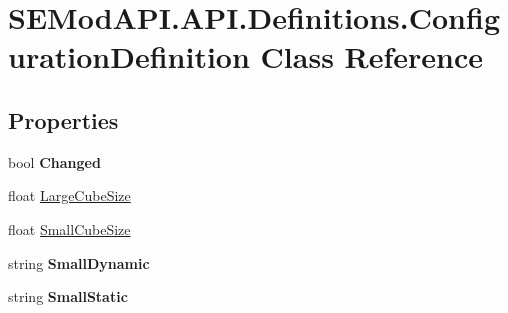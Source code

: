 \hypertarget{class_s_e_mod_a_p_i_1_1_a_p_i_1_1_definitions_1_1_configuration_definition}{}\section{S\+E\+Mod\+A\+P\+I.\+A\+P\+I.\+Definitions.\+Configuration\+Definition Class Reference}
\label{class_s_e_mod_a_p_i_1_1_a_p_i_1_1_definitions_1_1_configuration_definition}
\subsection*{Properties}
\begin{DoxyCompactItemize}
\item 
\hypertarget{class_s_e_mod_a_p_i_1_1_a_p_i_1_1_definitions_1_1_configuration_definition_a7245cb4a0904817e056743035be7d2b4}{}bool {\bfseries Changed}\label{class_s_e_mod_a_p_i_1_1_a_p_i_1_1_definitions_1_1_configuration_definition_a7245cb4a0904817e056743035be7d2b4}

\item 
float \hyperlink{class_s_e_mod_a_p_i_1_1_a_p_i_1_1_definitions_1_1_configuration_definition_ab9cdee5652ef56b1ce4592ad8c447992}{Large\+Cube\+Size}
\item 
float \hyperlink{class_s_e_mod_a_p_i_1_1_a_p_i_1_1_definitions_1_1_configuration_definition_aceadd5f38a6297da375f29a3b35865e6}{Small\+Cube\+Size}
\item 
\hypertarget{class_s_e_mod_a_p_i_1_1_a_p_i_1_1_definitions_1_1_configuration_definition_a1b3ec4d0b6eabd060cde540d10ef3a80}{}string {\bfseries Small\+Dynamic}\label{class_s_e_mod_a_p_i_1_1_a_p_i_1_1_definitions_1_1_configuration_definition_a1b3ec4d0b6eabd060cde540d10ef3a80}

\item 
\hypertarget{class_s_e_mod_a_p_i_1_1_a_p_i_1_1_definitions_1_1_configuration_definition_a007cf3754dbd9c6dd12fbab05ae3716b}{}string {\bfseries Small\+Static}\label{class_s_e_mod_a_p_i_1_1_a_p_i_1_1_definitions_1_1_configuration_definition_a007cf3754dbd9c6dd12fbab05ae3716b}


\end{DoxyCompactItemize}
